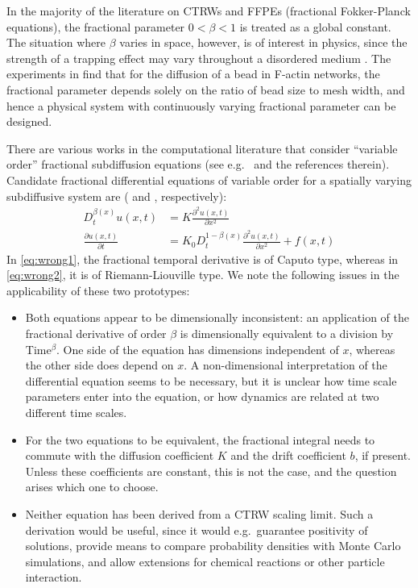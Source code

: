 \documentclass[a4paper,12pt]{elsarticle}
\numberwithin{equation}{section}
\theoremstyle{plain}
\theoremstyle{definition}
\theoremstyle{remark}
\numberwithin{equation}{section}
\newcommand{\1}{\mathbf 1}
\begin{document}
In the majority of the literature on CTRWs and FFPEs (fractional Fokker-Planck
equations), the
fractional parameter $0 < \beta < 1$ is treated as a global constant.  The
situation where $\beta$ varies in space, however, is of interest in physics,
since the strength of a trapping effect may vary throughout a disordered
medium
\cite{Wong04,Chechkin2005a,Korabel2010,Stickler2011,Fedotov2012,StrakaFedotov14}.
The experiments in \cite{Wong04} find that for the diffusion of a bead in
F-actin networks, the fractional parameter depends solely on the ratio of
bead size to mesh width, and hence a physical system with continuously varying
fractional parameter can be designed.

There are various works in the computational literature that consider ``variable
order'' fractional subdiffusion equations (see e.g.\ \cite{Chen2010,Sun2009} and
the references therein). Candidate fractional differential equations of
variable order for a spatially varying subdiffusive system are
(\cite[Eq.(8)]{Sun2009} and \cite[Eq.(1.2)]{Chen2010}, respectively):
\begin{align}
\label{eq:wrong1}
  D_t^{\beta(x)} u(x,t) &= K \frac{\partial^2 u(x,t)}{\partial x^2}
  \\
  \label{eq:wrong2}
  \frac{\partial u(x,t)}{\partial t} &= K {_0 D_t^{1-\beta(x)}}
  \frac{\partial^2 u(x,t)}{\partial x^2} + f(x,t)
\end{align}
In \eqref{eq:wrong1}, the fractional temporal derivative is of Caputo type,
whereas in \eqref{eq:wrong2}, it is of Riemann-Liouville type.
We note the following issues in the applicability of these two prototypes:
\begin{itemize}
  \item
  Both equations appear to be dimensionally inconsistent: an application of the
  fractional derivative of order $\beta$ is dimensionally equivalent to a
  division by Time$^{\beta}$. One side of the equation has dimensions
  independent of $x$, whereas the other side does depend on $x$.  A
  non-dimensional interpretation of the differential equation seems to be
  necessary, but it is unclear how time scale parameters enter into the
  equation, or how dynamics are related at two different time scales.
  \item
  For the two equations to be equivalent, the fractional integral needs to
  commute with the diffusion coefficient $K$ and the drift coefficient $b$,
  if present.  Unless these coefficients are constant, this is not the case,
  and the question arises which one to choose.
  \item
  Neither equation has been derived from a CTRW scaling limit. Such a derivation
  would be useful, since it would e.g.\ guarantee positivity of solutions,
  provide means to compare probability densities with Monte Carlo simulations,
  and allow extensions for chemical reactions or other particle interaction.
\end{itemize}
\end{document}

